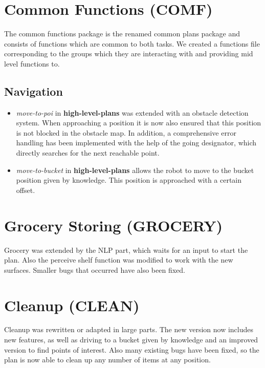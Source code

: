 \documentclass[main.tex]{subfiles}
\begin{document}
                \section{Common Functions (COMF)}
	                The common functions package is the renamed common plans package and consists of functions which are common to both tasks. We created a functions file corresponding to the groups which they are interacting with and providing mid level functions to.
	               
                \subsection{Navigation}
                  \begin{itemize}
                    \item \textit{move-to-poi} in \textbf{high-level-plans} was extended with an obstacle detection system. When approaching a position it is now also ensured that this position is not blocked in the obstacle map. In addition, a comprehensive error handling has been implemented with the help of the going designator, which directly searches for the next reachable point.
                    
                     \item \textit{move-to-bucket} in \textbf{high-level-plans} allows the robot to move to the bucket position given by knowledge. This position is approached with a certain offset.
                  \end{itemize}
                
                \section{Grocery Storing (GROCERY)}
                Grocery was extended by the NLP part, which waits for an input to start the plan. Also the perceive shelf function was modified to work with the new surfaces. Smaller bugs that occurred have also been fixed.
                
                \section{Cleanup (CLEAN)}
                Cleanup was rewritten or adapted in large parts. The new version now includes new features, as well as driving to a bucket given by knowledge and an improved version to find points of interest. Also many existing bugs have been fixed, so the plan is now able to clean up any number of items at any position.
                

	
\end{document}
